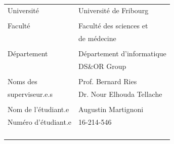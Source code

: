 \documentclass{mimosis}
\begin{document}
\begin{titlepage}
  	\vspace{1.5cm}
  	\begin{tabular}{L{4cm}l}
		Université	& Université de Fribourg\\
				&\\
  		Faculté 	& Faculté des sciences et\\
				& de médecine\\
				&\\
  		Département & Département d'informatique\\
				& DS\&OR Group\\
				&\\
  		Noms des & Prof. Bernard Ries \\
		superviseur.e.s & Dr. Nour Elhouda Tellache \\
						& \\
  		Nom de l'étudiant.e & Augustin Martignoni \\
  		Numéro d'étudiant.e & 16-214-546\\
  		\\
  		& \\
		&  \\
		\\
  	
  	\end{tabular}
  \end{titlepage}

\tableofcontents

\end{document}
